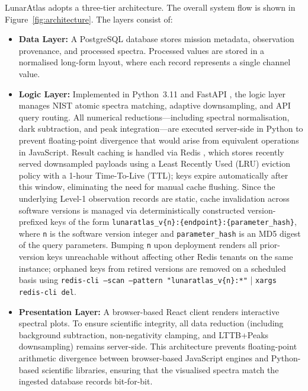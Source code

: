 \documentclass[final,5p,twocolumn,a4paper]{elsarticle}
\begin{document}
LunarAtlas adopts a three-tier architecture. The overall system flow is shown in Figure~\ref{fig:architecture}. The layers consist of:
\begin{itemize}
    \item \textbf{Data Layer:} A PostgreSQL database \cite{postgresql} stores mission metadata, observation provenance, and processed spectra. Processed values are stored in a normalised long-form layout, where each record represents a single channel value.
    \item \textbf{Logic Layer:} Implemented in Python~3.11 and FastAPI \cite{fastapi}, the logic layer manages NIST atomic spectra matching, adaptive downsampling, and API query routing. All numerical reductions---including spectral normalisation, dark subtraction, and peak integration---are executed server-side in Python to prevent floating-point divergence that would arise from equivalent operations in JavaScript. Result caching is handled via Redis \cite{redis}, which stores recently served downsampled payloads using a Least Recently Used (LRU) eviction policy with a 1-hour Time-To-Live (TTL); keys expire automatically after this window, eliminating the need for manual cache flushing. Since the underlying Level-1 observation records are static, cache invalidation across software versions is managed via deterministically constructed version-prefixed keys of the form \texttt{lunaratlas\_v\{n\}:\{endpoint\}:\{parameter\_hash\}}, where \texttt{n} is the software version integer and \texttt{parameter\_hash} is an MD5 digest of the query parameters. Bumping \texttt{n} upon deployment renders all prior-version keys unreachable without affecting other Redis tenants on the same instance; orphaned keys from retired versions are removed on a scheduled basis using \texttt{redis-cli --scan --pattern "lunaratlas\_v\{n\}:*"} | \texttt{xargs redis-cli del}.
    \item \textbf{Presentation Layer:} A browser-based React client \cite{react} renders interactive spectral plots. To ensure scientific integrity, all data reduction (including background subtraction, non-negativity clamping, and LTTB+Peaks downsampling) remains server-side. This architecture prevents floating-point arithmetic divergence between browser-based JavaScript engines and Python-based scientific libraries, ensuring that the visualised spectra match the ingested database records bit-for-bit.
\end{itemize}
\end{document}
